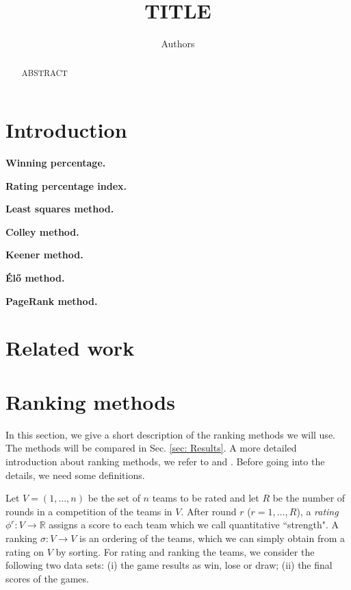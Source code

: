 \documentclass{article}
\title{TITLE}
\author{Authors}
\begin{document}
\maketitle

\begin{abstract}

ABSTRACT
\end{abstract}

\section{Introduction}\label{sec:1}

\noindent\textbf{Winning percentage.}

\noindent\textbf{Rating percentage index.}

\noindent\textbf{Least squares method.}

\noindent\textbf{Colley method.}

\noindent\textbf{Keener method.}

\noindent\textbf{\'El\H{o} method.}

\noindent\textbf{PageRank method.}

\section{Related work}

\section{Ranking methods}

In this section, we give a short description of the ranking methods we will use. The methods will be compared in Sec. \ref{sec: Results}. A more detailed introduction about ranking methods, we refer to \cite{} and \cite{}. Before going into the details, we need some definitions.

Let $V=(1, \dots, n)$ be the set of $n$ teams to be rated and let $R$ be the number of rounds in a competition of the teams in $V$. After round $r$ ($r=1, \dots, R$), a \textit{rating} $\phi^{r}: V \rightarrow \mathbb{R}$ assigns a score to each team which we call quantitative ``strength". A ranking $\sigma: V\rightarrow V$ is an ordering of the teams, which we can simply obtain from a rating on $V$ by sorting. For rating and ranking the teams, we consider the following two data sets: (i) the game results as win, lose or draw; (ii) the final scores of the games.
\end{document}
